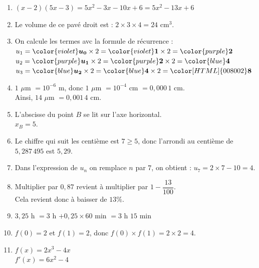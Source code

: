 \documentclass[a4paper,11pt,landscape,exos]{nsi} %
\begin{document}
\begin{multicols}{2}
\begin{enumerate}[itemsep=.75em]
\item $(x-2)(5x-3)=5x^2-3x-10x+6=5x^2-13x+6$
\item Le volume de ce pavé droit est : $2\times 3\times 4=24$ cm$^3$.
\item On calcule les termes avc la formule de récurrence :\\ $u_{1} = {\color{violet}\boldsymbol{ u_{0}}} \times 2 =
                    {\color{violet}\boldsymbol{1}} \times 2 = {\color{purple}\boldsymbol{2}}$\\ $u_{2} = {\color{purple}\boldsymbol{ u_{1}}} \times 2 =
                    {\color{purple}\boldsymbol{2}} \times 2 = {\color{blue}\boldsymbol{4}}$\\ $u_{3} = {\color{blue}\boldsymbol{ u_{2}}} \times 2 =
                    {\color{blue}\boldsymbol{4}} \times 2 = {\color[HTML]{008002}\boldsymbol{8}}$
\item $1$ $\mu$m $=10^{-6}$ m, donc $1$ $\mu$m  $=10^{-4}$ cm  $=0{,}000\,1$ cm.\\
            Ainsi, $14$ $\mu$m $=0{,}001\,4$ cm.
\item L'abscisse du point $B$ se lit sur l'axe horizontal. \\
            $x_B=5$.
            
\item Le chiffre qui suit les centième est $7\geqslant5$, donc l'arrondi au centième de $5{,}287\,495$ est $5{,}29$.
\item Dans l'expression de $u_n$ on remplace $n$ par $7$, on obtient : $u_{7} =2 \times 7 -10=4$.
\item Multiplier par $0{,}87$ revient à multiplier par $1-\dfrac{13}{100}$. \\
          Cela revient donc à baisser de $13 \%$. 
\item $3{,}25$ h $ = 3$ h $ + 0{,}25 \times 60$ min $  = 3$ h $15$ min
\item $f(0)=2$ et $f(1)=2$, donc $f(0)\times f(1)=2\times 2=4$.
\item $f(x)=2x^3-4x$\\
          $f'(x)=6x^2-4$
\end{enumerate}
\end{multicols}
\end{document}
